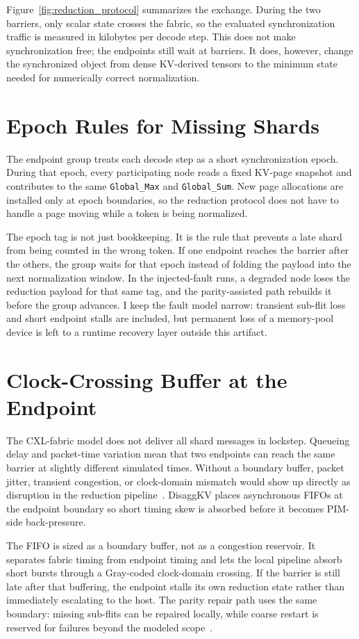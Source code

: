 Figure~\ref{fig:reduction_protocol} summarizes the exchange. During the two barriers, only scalar state crosses the fabric, so the evaluated synchronization traffic is measured in kilobytes per decode step. This does not make synchronization free; the endpoints still wait at barriers. It does, however, change the synchronized object from dense KV-derived tensors to the minimum state needed for numerically correct normalization.

\section{Epoch Rules for Missing Shards}

The endpoint group treats each decode step as a short synchronization epoch. During that epoch, every participating node reads a fixed KV-page snapshot and contributes to the same \texttt{Global\_Max} and \texttt{Global\_Sum}. New page allocations are installed only at epoch boundaries, so the reduction protocol does not have to handle a page moving while a token is being normalized.

The epoch tag is not just bookkeeping. It is the rule that prevents a late shard from being counted in the wrong token. If one endpoint reaches the barrier after the others, the group waits for that epoch instead of folding the payload into the next normalization window. In the injected-fault runs, a degraded node loses the reduction payload for that same tag, and the parity-assisted path rebuilds it before the group advances. I keep the fault model narrow: transient sub-flit loss and short endpoint stalls are included, but permanent loss of a memory-pool device is left to a runtime recovery layer outside this artifact.

\section{Clock-Crossing Buffer at the Endpoint}

The CXL-fabric model does not deliver all shard messages in lockstep. Queueing delay and packet-time variation mean that two endpoints can reach the same barrier at slightly different simulated times. Without a boundary buffer, packet jitter, transient congestion, or clock-domain mismatch would show up directly as disruption in the reduction pipeline~\cite{hpc_network}. DisaggKV places asynchronous FIFOs at the endpoint boundary so short timing skew is absorbed before it becomes PIM-side back-pressure.

The FIFO is sized as a boundary buffer, not as a congestion reservoir. It separates fabric timing from endpoint timing and lets the local pipeline absorb short bursts through a Gray-coded clock-domain crossing. If the barrier is still late after that buffering, the endpoint stalls its own reduction state rather than immediately escalating to the host. The parity repair path uses the same boundary: missing sub-flits can be repaired locally, while coarse restart is reserved for failures beyond the modeled scope~\cite{cxl_memory_failure}.

